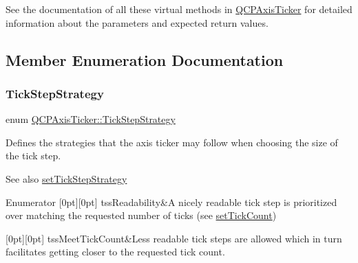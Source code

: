 See the documentation of all these virtual methods in \hyperlink{classQCPAxisTicker}{Q\+C\+P\+Axis\+Ticker} for detailed information about the parameters and expected return values. 

\subsection{Member Enumeration Documentation}
\mbox{\label{classQCPAxisTicker_ab6d2f9d9477821623ac9bc4b21ddf49a}} 
\subsubsection{\texorpdfstring{Tick\+Step\+Strategy}{TickStepStrategy}}
{\footnotesize\ttfamily enum \hyperlink{classQCPAxisTicker_ab6d2f9d9477821623ac9bc4b21ddf49a}{Q\+C\+P\+Axis\+Ticker\+::\+Tick\+Step\+Strategy}}

Defines the strategies that the axis ticker may follow when choosing the size of the tick step.

\begin{DoxySeeAlso}{See also}
\hyperlink{classQCPAxisTicker_a73b1d847c1a12159af6bfda4ebebe7d5}{set\+Tick\+Step\+Strategy} 
\end{DoxySeeAlso}
\begin{DoxyEnumFields}{Enumerator}
[0pt][0pt]{}\mbox{\label{classQCPAxisTicker_ab6d2f9d9477821623ac9bc4b21ddf49aa9002aa2fd5633ab5556c71a26fed63a8}} 
tss\+Readability&A nicely readable tick step is prioritized over matching the requested number of ticks (see \hyperlink{classQCPAxisTicker_a47752abba8293e6dc18491501ae34008}{set\+Tick\+Count}) \\
\hline

[0pt][0pt]{}\mbox{\label{classQCPAxisTicker_ab6d2f9d9477821623ac9bc4b21ddf49aa770312b6b9b0c64a37ceeba96e0cd7f2}} 
tss\+Meet\+Tick\+Count&Less readable tick steps are allowed which in turn facilitates getting closer to the requested tick count. \\
\hline

\end{DoxyEnumFields}



